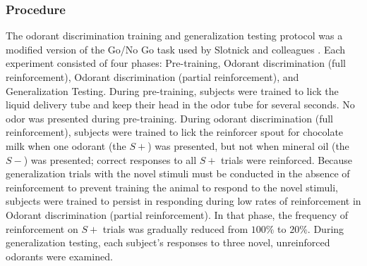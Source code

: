 \subsubsection*{Procedure}
\label{sec:methods_procedure}
The odorant discrimination training and generalization testing protocol was a modified version of the Go/No Go task used by Slotnick and colleagues \cite{18428626}. Each experiment consisted of four phases: Pre-training, Odorant discrimination (full reinforcement), Odorant discrimination (partial reinforcement), and Generalization Testing. During pre-training, subjects were trained to lick the liquid delivery tube and keep their head in the odor tube for several seconds. No odor was presented during pre-training. During odorant discrimination (full reinforcement), subjects were trained to lick the reinforcer spout for chocolate milk when one odorant (the $S+$) was presented, but not when mineral oil (the $S-$) was presented; correct responses to all $S+$ trials were reinforced. Because generalization trials with the novel stimuli must be conducted in the absence of reinforcement to prevent training the animal to respond to the novel stimuli, subjects were trained to persist in responding during low rates of reinforcement in Odorant discrimination (partial reinforcement). In that phase, the frequency of reinforcement on $S+$ trials was gradually reduced from $100\%$ to $20\%$. During generalization testing, each subject's responses to three novel, unreinforced odorants were examined.

